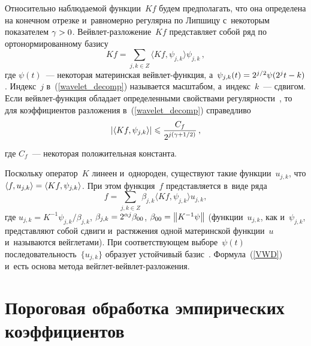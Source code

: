 \begin{multicols}{2}
Относительно наблюдаемой функции~$Kf$ будем предполагать, что она определена на 
конечном отрезке и~равномерно регулярна по Липшицу с~некоторым показателем $\gamma\hm>0$. 
Вейв\-лет-разложение~$Kf$ представляет собой ряд по ортонормированному базису
\begin{equation}
\label{wavelet_decomp}
Kf = \sum\limits_{j,k \in Z} \langle Kf,\psi_{j,k} \rangle \psi_{j,k}\,,
\end{equation}
где $\psi(t)$~--- некоторая материнская вейв\-лет-функ\-ция, 
а~$\psi_{j,k}(t) \hm= 2^{j/2}\psi(2^jt \hm- k)$. Индекс~$j$ в~(\ref{wavelet_decomp}) 
называется масштабом, а~индекс~$k$~--- сдвигом. Если вейв\-лет-функ\-ция 
обладает определенными свойствами регулярности~\cite{Mal99}, 
то для коэффициентов разложения в~(\ref{wavelet_decomp}) справедливо
\begin{equation}
\label{wavelet_decay}
\left\vert\langle Kf, \psi_{j,k} \rangle\right\vert \leqslant \displaystyle\frac{\displaystyle C_f\mathstrut}{\displaystyle 2^{j \left( \gamma + 1/2 \right)}\mathstrut}\,,
\end{equation}
где $C_f$~--- некоторая положительная константа.

Поскольку оператор~$K$ линеен и~однороден, существуют такие функции~$u_{j,k}$, 
что $\langle f,u_{j,k}\rangle\hm=\langle Kf,\psi_{j,k}\rangle$. При этом функция~$f$ 
представляется в~виде ряда
\begin{equation}
\label{VWD}
f = \sum\limits_{j,k \in Z}\beta_{j,k}\langle Kf,\psi_{j,k}\rangle u_{j,k},
\end{equation}
где $u_{j,k} = K^{-1}\psi_{j,k}/\beta_{j,k}$, $\beta_{j,k}\hm=2^{\alpha j}\beta_{00}$, 
$\beta_{00} \hm= \norm{K^{-1}\psi}$ (функции~$u_{j,k}$, как и~$\psi_{j,k}$, 
представляют собой сдвиги и~растяжения одной материнской функции~$u$ и~называются 
вейглетами). При соответствующем выборе~$\psi(t)$ последовательность~$\{u_{j,k}\}$ 
образует устойчивый базис~\cite{L97}. Формула~(\ref{VWD}) и~есть основа метода 
вейг\-лет-вейв\-лет-раз\-ло\-же\-ния.

\section*{Пороговая обработка эмпирических коэффициентов}


\end{multicols}
